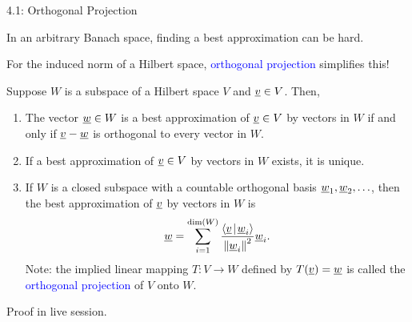 \documentclass[10pt,english,aspectratio=169]{beamer}
\begin{document}
\begin{frame}{4.1: Orthogonal Projection}

In an arbitrary Banach space, finding a best approximation can be hard.
\vspace{0.5mm}

For the induced norm of a Hilbert space, \textcolor{blue}{orthogonal projection} simplifies this!

\begin{theorem}[Projection] Suppose $W$ is a subspace of a Hilbert space $V$ and $\underline{v} \in V$.
Then,
\begin{enumerate}
\item The vector $\underline{w} \in W$ is a best approximation of $\underline{v} \in V$ by vectors in $W$ if and only if $\underline{v} - \underline{w}$ is orthogonal to every vector in $W$.
\item If a best approximation of $\underline{v} \in V$ by vectors in $W$ exists, it is unique.
\item If $W$ is a closed subspace with a countable orthogonal basis $\underline{w}_1, \underline{w}_2, \ldots$, then the best approximation of $\underline{v}$ by vectors in $W$ is \vspace{-1.5mm}
\begin{equation*}
\vecnot{w} = \sum_{i=1}^{\dim (W)} \frac{ \inner{ \vecnot{v} }{ \vecnot{w}_i } }{ \left\| \vecnot{w}_i \right\|^2 } \vecnot{w}_i . \vspace{-1mm}
\end{equation*}
Note: the implied linear mapping $T\colon V \to W$ defined by $T(\underline{v}) = \underline{w}$ is called the \textcolor{blue}{orthogonal projection} of $V$ onto $W$.
\end{enumerate}
\end{theorem}

Proof in live session.

\end{frame}
\end{document}
